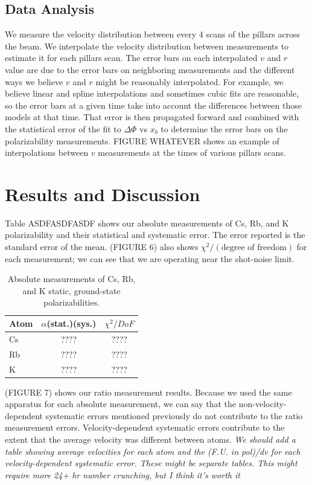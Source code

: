\documentclass[twocolumn, prl,showpacs,superscriptaddress]{revtex4-1}   %
\begin{document}
\subsection{Data Analysis}

We measure the velocity distribution between every 4 scans of the pillars across the beam. We interpolate the velocity distribution between measurements to estimate it for each pillars scan. The error bars on each interpolated $v$ and $r$ value are due to the error bars on neighboring measurements and the different ways we believe $v$ and $r$ might be reasonably interpolated. For example, we believe linear and spline interpolations and sometimes cubic fits are reasonable, so the error bars at a given time take into account the differences between those models at that time. That error is then propagated forward and combined with the statistical error of the fit to $\Delta\Phi$ vs $x_b$ to determine the error bars on the polarizability measurements. FIGURE WHATEVER shows an example of interpolations between $v$ measurements at the times of various pillars scans.

\section{Results and Discussion}

Table ASDFASDFASDF shows our absolute measurements of Cs, Rb, and K polarizability and their statistical and systematic error. The error reported is the standard error of the mean. (FIGURE 6) also shows $\chi^2/(\text{degree of freedom})$ for each measurement; we can see that we are operating near the shot-noise limit. 

\begingroup
\begin{table}
\caption{\label{tableAbs}Absolute measurements of Cs, Rb, and K static, ground-state polarizabilities.}
\begin{center}
\begin{tabular}{l c c}
\hline\hline
Atom & $\alpha$(stat.)(sys.) & $\chi^2/DoF$ \\
\hline
Cs & ???? & ???? \\
Rb & ???? & ???? \\
K  & ???? & ???? \\
\hline\hline
\end{tabular}
\end{center}
\end{table}
\endgroup

(FIGURE 7) shows our ratio measurement results. Because we used the same apparatus for each absolute measurement, we can say that the non-velocity-dependent systematic errors mentioned previously do not contribute to the ratio measurement errors. Velocity-dependent systematic errors contribute to the extent that the average velocity was different between atoms. \textit{We should add a table showing average velocities for each atom and the (F.U. in pol)/dv for each velocity-dependent systematic error. These might be separate tables. This might require more 24+ hr number crunching, but I think it's worth it} 
\end{document}
